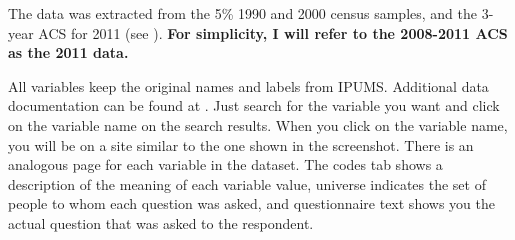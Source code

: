 \documentclass[a4paper, 11pt,addpoints]{exam}
\begin{document}
	The data was extracted from the 5\% 1990 and 2000 census samples, and the 3-year ACS for 2011 (see ). \textbf{For simplicity, I will refer to the 2008-2011 ACS as the 2011 data.}
	
	All variables keep the original names and labels from IPUMS.  Additional data documentation can be found at . Just search for the variable you want and click on the variable name on the search results. When you click on the variable name, you will be on a site similar to the one shown in the screenshot. There is an analogous page for each variable in the dataset. The codes tab shows a description of the meaning of each variable value, universe indicates the set of people to whom each question was asked, and questionnaire text shows you the actual question that was asked to the respondent. 
	
\end{document}
